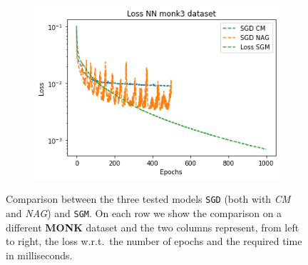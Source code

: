 \begin{figure}[H]
\begin{subfigure}{.45\textwidth}
{            \includegraphics[width=\linewidth]{res/loss_monk3_ep.png}\hspace*{2.5em}%
        }
	\end{subfigure}
	\begin{subfigure}{.45\textwidth}
	    \centering
	\end{subfigure}
	\caption{Comparison between the three tested models \texttt{SGD} (both with \textit{CM} and \textit{NAG}) and \texttt{SGM}. On each row we show the comparison on a different \textbf{MONK} dataset and the two columns represent, from left to right, the loss w.r.t.\ the number of epochs and the required time in milliseconds.}
	\label{fig:monk_loss}
\end{figure}

